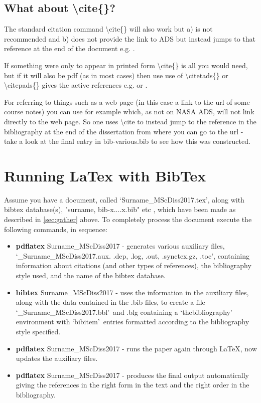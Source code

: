 \documentclass[twoside,fontsize=12pt,
     bibliography=totoc, %
     listof=totoc, %
     index=totoc, %
     onehalfspacing %
]{_MScDiss2017_cls}
\begin{document}
\subsection{What about \textbackslash cite\{\}?} 
\label{subsec;cite}
The standard citation command \textbackslash cite\{\} will also work but a) is not recommended and b) does not provide the link to ADS but instead jumps to that reference at the end of the document e.g. \cite{1993dca..book....9W}. 

If something were only to appear in printed form \textbackslash cite\{\} is all you would need, but if it will also be pdf (as in most cases) then use use of  \textbackslash citetads\{\}  or \textbackslash citepads\{\}  gives the active references e.g.  or .

For referring to things such as a web page (in this case a link to the url of some course notes) you can use for example  \cite{QMULExtrasolarPlanetlecturenotes} which, as not on NASA ADS, will not link directly to the web page. So one uses \textbackslash cite to instead jump to the reference in the bibliography at the end of the dissertation from where you can go to the url - take a look at the final entry in bib-various.bib to see how this was constructed.

\section{Running LaTex with BibTex}
\label{sec:running}
Assume you have a document, called \lq Surname\_MScDiss2017.tex\rq , along with bibtex database(s), "surname, bib-x....x.bib" etc , which have been made as described in \ref{sec:gather} above. To completely process the document execute the following commands, in sequence:

\begin{itemize}{}
\item {\bf pdflatex} Surname\_MScDiss2017  - generates various auxiliary files, 
\newline \lq \_Surname\_MScDiss2017.aux. .dep, .log, .out, .synctex.gz, .toc\rq , containing information about citations (and other types of references), the bibliography style used, and the name of the bibtex database. 
\item {\bf bibtex} Surname\_MScDiss2017  - uses the information in the auxiliary files, along with the data contained in the .bib files, to create a file\\ \lq \_Surname\_MScDiss2017.bbl\rq\, and .blg containing a \lq thebibliography\rq\, environment with \lq bibitem\rq\, entries formatted according to the bibliography style specified.
\item {\bf pdflatex}  Surname\_MScDiss2017 - runs  the paper again through LaTeX, now updates the auxiliary files.
\item {\bf pdflatex}  Surname\_MScDiss2017 - produces the final  output automatically giving the references in the right form in the text and the right order in the bibliography. 
\end{itemize}
\end{document}
